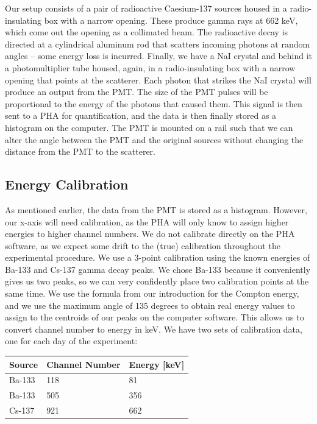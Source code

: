 \documentclass{article}
\begin{document}
Our setup consists of a pair of radioactive Caesium-137 sources housed in a radio-insulating box with a narrow opening. These produce gamma rays at 662 keV, which come out the opening as a collimated beam. The radioactive decay is directed at a cylindrical aluminum rod that scatters incoming photons at random angles – some energy loss is incurred. Finally, we have a NaI crystal and behind it a photomultiplier tube housed, again, in a radio-insulating box with a narrow opening that points at the scatterer. Each photon that strikes the NaI crystal will produce an output from the PMT. The size of the PMT pulses will be proportional to the energy of the photons that caused them. This signal is then sent to a PHA for quantification, and the data is then finally stored as a histogram on the computer. The PMT is mounted on a rail such that we can alter the angle between the PMT and the original sources without changing the distance from the PMT to the scatterer.

\subsection{Energy Calibration}
As mentioned earlier, the data from the PMT is stored as a histogram. However, our x-axis will need calibration, as the PHA will only know to assign higher energies to higher channel numbers. We do not calibrate directly on the PHA software, as we expect some drift to the (true) calibration throughout the experimental procedure. We use a 3-point calibration using the known energies of Ba-133 and Cs-137 gamma decay peaks. We chose Ba-133 because it conveniently gives us two peaks, so we can very confidently place two calibration points at the same time. We use the formula from our introduction for the Compton energy, and we use the maximum angle of 135 degrees to obtain real energy values to assign to the centroids of our peaks on the computer software. This allows us to convert channel number to energy in keV. We have two sets of calibration data, one for each day of the experiment:

\begin{center}
    \centering
     \label{tab:title} 
    \begin{tabular}{| l | l | l |}
    \hline
    Source & Channel Number & Energy [keV] \\ \hline
    Ba-133 & 118 & 81 \\ \hline
    Ba-133 & 505 & 356 \\ \hline
    Cs-137 & 921 & 662 \\ \hline
    \end{tabular}
\end{center}
\end{document}
